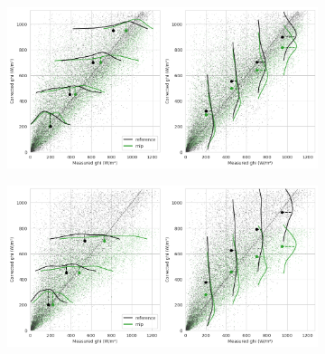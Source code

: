 \begin{figure}[]
    \centering
    \begin{subfigure}{1\columnwidth}
        \includegraphics[width=\columnwidth]{figures/first_study/scatter_plot_mlp_site1_rmse.png}
    \end{subfigure}
\medskip
    \begin{subfigure}{1\columnwidth}
        \includegraphics[width=\columnwidth]{figures/first_study/scatter_plot_mlp_site2_rmse.png}
    \end{subfigure}
\end{figure}
